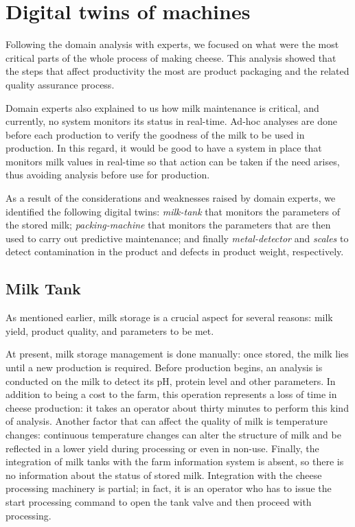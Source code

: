 \section{Digital twins of machines}
Following the domain analysis with experts, we focused on what were the most critical parts of the whole process of making cheese.
This analysis showed that the steps that affect productivity the most are product packaging and the related quality assurance process.

Domain experts also explained to us how milk maintenance is critical, and currently, no system monitors its status in real-time.
Ad-hoc analyses are done before each production to verify the goodness of the milk to be used in production.
In this regard, it would be good to have a system in place that monitors milk values in real-time so that action can be taken if the need arises,
thus avoiding analysis before use for production.

As a result of the considerations and weaknesses raised by domain experts, we identified the following digital twins:
\textit{milk-tank} that monitors the parameters of the stored milk; \textit{packing-machine} that monitors the parameters that are then used to carry
out predictive maintenance; and finally \textit{metal-detector} and \textit{scales} to detect contamination in the product and defects in product weight, respectively.

\subsection{Milk Tank}
As mentioned earlier, milk storage is a crucial aspect for several reasons: milk yield, product quality, and parameters to be met.

At present, milk storage management is done manually: once stored, the milk lies until a new production is required.
Before production begins, an analysis is conducted on the milk to detect its pH, protein level and other parameters.
In addition to being a cost to the farm, this operation represents a loss of time in cheese production: it takes an operator about thirty minutes to
perform this kind of analysis.
Another factor that can affect the quality of milk is temperature changes: continuous temperature changes can alter the structure of milk and be 
reflected in a lower yield during processing or even in non-use.
Finally, the integration of milk tanks with the farm information system is absent, so there is no information about the status of stored milk.
Integration with the cheese processing machinery is partial; in fact, it is an operator who has to issue the start processing command to open the 
tank valve and then proceed with processing.

